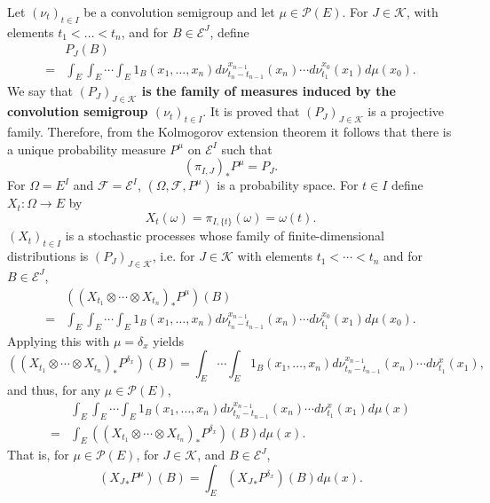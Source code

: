 \documentclass{article}
\theoremstyle{definition}
\theoremstyle{definition}
\begin{document}
Let $(\nu_t)_{t  \in I}$ be a convolution semigroup and let $\mu \in \mathscr{P}(E)$.
For $J \in \mathscr{K}$, with elements $t_1<\ldots<t_n$, and for $B \in \mathscr{E}^J$,
define
\begin{equation}
\begin{split}
&P_J(B)\\
=&\int_E \int_E \cdots \int_E 1_B(x_1,\ldots,x_n)
d\nu_{t_n-t_{n-1}}^{x_{n-1}}(x_n) \cdots d\nu_{t_1}^{x_0} (x_1) d\mu(x_0).
\end{split}
\label{PJ}
\end{equation}
We say that \textbf{$(P_J)_{J \in \mathscr{K}}$ is the family of measures induced by the convolution semigroup
$(\nu_t)_{t \in I}$}.
It is proved that $(P_J)_{J \in \mathscr{K}}$ is a projective family. Therefore, from the Kolmogorov extension theorem it follows that there is a unique probability measure $P^\mu$ on
$\mathscr{E}^I$ such that 
\begin{equation}
(\pi_{I,J})_* P^\mu = P_J.
\label{376}
\end{equation}
For  $\Omega=E^I$ and $\mathscr{F}=\mathscr{E}^I$, 
$(\Omega,\mathscr{F},P^\mu)$ is a probability space.
For $t \in I$ define $X_t:\Omega \to E$ by
\[
X_t(\omega)=\pi_{I,\{t\}}(\omega) = \omega(t). 
\]
$(X_t)_{t \in I}$ is a stochastic processes whose family of finite-dimensional distributions is
$(P_J)_{J \in \mathscr{K}}$, i.e.
for $J \in \mathscr{K}$ with elements $t_1<\cdots<t_n$ and for $B \in \mathscr{E}^J$,
\[
\begin{split}
&((X_{t_1} \otimes \cdots \otimes X_{t_n})_*P^\mu)(B)\\
=&\int_E \int_E \cdots \int_E 1_B(x_1,\ldots,x_n)
d\nu_{t_n-t_{n-1}}^{x_{n-1}}(x_n) \cdots d\nu_{t_1}^{x_0} (x_1) d\mu(x_0).
\end{split}
\]
Applying this with $\mu=\delta_x$ yields
\[
((X_{t_1} \otimes \cdots \otimes X_{t_n})_*P^{\delta_x})(B)
=\int_E \cdots \int_E  1_B(x_1,\ldots,x_n) d\nu_{t_n-t_{n-1}}^{x_{n-1}}(x_n) \cdots d\nu_{t_1}^{x} (x_1),
\]
and thus, for any $\mu \in \mathscr{P}(E)$,
\[
\begin{split}
&\int_E \int_E \cdots \int_E  1_B(x_1,\ldots,x_n) d\nu_{t_n-t_{n-1}}^{x_{n-1}}(x_n) \cdots d\nu_{t_1}^{x} (x_1) d\mu(x)\\
=&\int_E ((X_{t_1} \otimes \cdots \otimes X_{t_n})_*P^{\delta_x})(B) d\mu(x).
\end{split}
\]
That is, for $\mu \in \mathscr{P}(E)$,
for $J \in \mathscr{K}$, and $B \in \mathscr{E}^J$,
\begin{equation}
({X_J}_*P^{\mu})(B) = \int_E ({X_J}_*P^{\delta_x})(B)d\mu(x).
\label{3621}
\end{equation}
\end{document}

